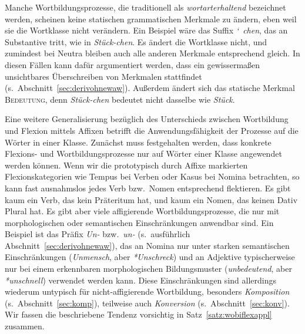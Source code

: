 Manche Wortbildungsprozesse, die traditionell als \textit{wortarterhaltend} bezeichnet werden, scheinen keine statischen grammatischen Merkmale zu ändern, eben weil sie die Wortklasse nicht verändern.
Ein Beispiel wäre das Suffix \mbox{\textit{\char`~chen}}, das an Substantive tritt, wie in \textit{Stück-chen}.
Es ändert die Wortklasse nicht, und zumindest bei Neutra bleiben auch alle anderen Merkmale entsprechend gleich.
In diesen Fällen kann dafür argumentiert werden, dass ein gewissermaßen unsichtbares Überschreiben von Merkmalen stattfindet (s.\ Abschnitt~\ref{sec:derivohnewaw}).
Außerdem ändert sich das statische Merkmal \textsc{Bedeutung}, denn \textit{Stück-chen} bedeutet nicht dasselbe wie \textit{Stück}.

Eine weitere Generalisierung bezüglich des Unterschieds zwischen Wortbildung und Flexion mittels Affixen betrifft die Anwendungsfähigkeit der Prozesse auf die Wörter in einer Klasse.
Zunächst muss festgehalten werden, dass konkrete Flexions- und Wortbildungsprozesse nur auf Wörter einer Klasse angewendet werden können.
Wenn wir die prototypisch durch Affixe markierten Flexionskategorien wie Tempus bei Verben oder Kasus bei Nomina betrachten, so kann fast ausnahmslos jedes Verb bzw.\ Nomen entsprechend flektieren.
Es gibt \zB kaum ein Verb, das kein Präteritum hat, und kaum ein Nomen, das keinen Dativ Plural hat.
Es gibt aber viele affigierende Wortbildungsprozesse, die nur mit morphologischen oder semantischen Einschränkungen anwendbar sind.
Ein Beispiel ist das Präfix \textit{Un-} bzw.\ \textit{un-} (s.\ ausführlich Abschnitt~\ref{sec:derivohnewaw}), das an Nomina nur unter starken semantischen Einschränkungen (\textit{Unmensch}, aber \textit{*Unschreck}) und an Adjektive typischerweise nur bei einem erkennbaren morphologischen Bildungsmuster (\textit{unbedeutend}, aber \textit{*unschnell}) verwendet werden kann.
Diese Einschränkungen sind allerdings wiederum untypisch für nicht-affigierende Wortbildung, besonders \textit{Komposition} (s.\ Abschnitt~\ref{sec:komp}), teilweise auch \textit{Konversion} (s.\ Abschnitt~\ref{sec:konv}).
Wir fassen die beschriebene Tendenz vorsichtig in Satz~\ref{satz:wobiflexappl} zusammen.


